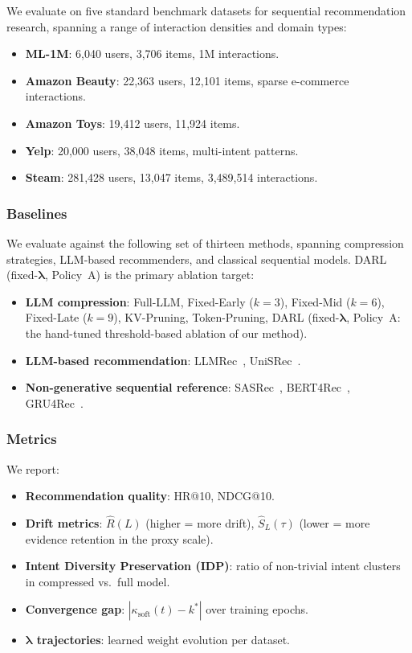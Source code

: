 \documentclass[lettersize,journal]{IEEEtran}
\newcommand{\bS}{\hat{S}}
\newcommand{\bR}{\hat{R}}
\newcommand{\lambdavec}{\boldsymbol{\lambda}}
\begin{document}
We evaluate on five standard benchmark datasets for
sequential recommendation research, spanning a range of
interaction densities and domain types:
\begin{itemize}
  \item \textbf{ML-1M}: 6,040 users, 3,706 items, 1M interactions.
  \item \textbf{Amazon Beauty}: 22,363 users, 12,101 items, sparse
    e-commerce interactions.
  \item \textbf{Amazon Toys}: 19,412 users, 11,924 items.
  \item \textbf{Yelp}: 20,000 users, 38,048 items, multi-intent patterns.
  \item \textbf{Steam}: 281,428 users, 13,047 items, 3,489,514 interactions.
\end{itemize}

\subsubsection{Baselines}

We evaluate against the following set of thirteen methods,
spanning compression strategies, LLM-based recommenders,
and classical sequential models.
DARL (fixed-$\lambdavec$, Policy~A) is the primary ablation target:
\begin{itemize}
  \item \textbf{LLM compression}: Full-LLM, Fixed-Early ($k=3$),
    Fixed-Mid ($k=6$), Fixed-Late ($k=9$), KV-Pruning,
    Token-Pruning, DARL (fixed-$\lambdavec$, Policy~A: the
    hand-tuned threshold-based ablation of our method).
  \item \textbf{LLM-based recommendation}: LLMRec~\cite{wei2024llmrec},
    UniSRec~\cite{hou2022unisrec}.
  \item \textbf{Non-generative sequential reference}:
    SASRec~\cite{kang2018sasrec}, BERT4Rec~\cite{sun2019bert4rec},
    GRU4Rec~\cite{hidasi2016gru4rec}.
\end{itemize}

\subsubsection{Metrics}

We report:
\begin{itemize}
  \item \textbf{Recommendation quality}: HR@10, NDCG@10.
  \item \textbf{Drift metrics}: $\bR(L)$ (higher = more drift),
    $\bS_L(\tau)$ (lower = more evidence retention in the proxy scale).
  \item \textbf{Intent Diversity Preservation (IDP)}: ratio of
    non-trivial intent clusters in compressed vs.\ full model.
  \item \textbf{Convergence gap}: $|\kappa_{\text{soft}}(t) - k^*|$
    over training epochs.
  \item \textbf{$\lambdavec$ trajectories}: learned weight evolution
    per dataset.
\end{itemize}
\end{document}
